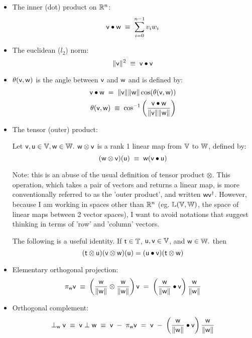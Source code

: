 \begin{itemize}
\item The inner (dot) product on $\mathbb{R}^n$:
\begin{equation}
\mathsf{v} \bullet \mathsf{w} \; \equiv \; \sum_{i=0}^{n-1} v_i w_i
\end{equation}

\item The euclidean ($l_2$) norm:
\begin{equation}
\| \mathsf{v} \|^2 \; \equiv \; \mathsf{v} \bullet \mathsf{v}
\end{equation}

\item $\theta(\mathsf{v},\mathsf{w})$ is the angle between $\mathsf{v}$ and $\mathsf{w}$
and is defined by:
\begin{eqnarray}
\mathsf{v} \bullet \mathsf{w} \; = \; \| \mathsf{v} \| \| \mathsf{w} \| \cos(\theta(\mathsf{v},\mathsf{w}))
\\
\theta(\mathsf{v},\mathsf{w})
\; \equiv \;
\cos^{-1} \left(\frac{ \mathsf{v} \bullet \mathsf{w} }{\| \mathsf{v} \| \| \mathsf{w} \| } \right)
\nonumber
\end{eqnarray}

\item The tensor (outer) product:

Let $\mathsf{v}, \mathsf{u} \in \mathbb{V}, \mathsf{w} \in \mathbb{W}.$
$\mathsf{w} \otimes \mathsf{v}$ is a rank 1 linear map
from $\mathbb{V}$ to $\mathbb{W}$, defined by:
\begin{equation}
(\mathsf{w} \otimes \mathsf{v})(\mathsf{u}) \; \equiv \; \mathsf{w} (\mathsf{v} \bullet \mathsf{u})
\end{equation}

Note: this is an abuse of the usual definition of tensor product $\otimes$.
This operation, which takes a pair of vectors and returns a linear map,
is more conventionally referred to as the 'outer product',
and written $\mathsf{w} \mathsf{v}^{\dagger}$.
However, because I am working in spaces other than $\mathbb{R}^n$
(eg. $\mathbb{L}(\mathbb{V},\mathbb{W})$, the space of linear maps
between 2 vector spaces),
I want to avoid notations that suggest thinking in terms
of 'row' and 'column' vectors.

The following is a useful identity.
If $\mathsf{t} \in \mathbb{T}$, $\mathsf{u}, \mathsf{v} \in \mathbb{V}$, and $\mathsf{w} \in \mathbb{W}.$
then
\begin{equation}
\label{eq:tensor-dot}
(\mathsf{t} \otimes \mathsf{u}) (\mathsf{v} \otimes \mathsf{w})(\mathsf{u}) = (\mathsf{u} \bullet \mathsf{v}) (\mathsf{t} \otimes \mathsf{w})
\end{equation}

\item Elementary orthogonal projection:
\begin{equation}
\pi_{\mathsf{w}} \mathsf{v}
\; \equiv \;
\left( \frac{ \mathsf{w} }{ \| \mathsf{w} \| } \otimes \frac{ \mathsf{w} }{ \| \mathsf{w} \| } \right) \mathsf{v}
\; = \;
\left( \frac{\mathsf{w} }{\|\mathsf{w}\|} \bullet \mathsf{v} \right) \frac{\mathsf{w}}{\|\mathsf{w}\|}
\end{equation}

\item Orthogonal complement:
\begin{equation}
\perp_{\mathsf{w}} \mathsf{v}
\; \equiv \;
\mathsf{v} \perp \mathsf{w}
\; \equiv \;
\mathsf{v} \; - \; \pi_{\mathsf{w}} \mathsf{v}
\; = \;
\mathsf{v} \; - \; \left( \frac{\mathsf{w}}{\|\mathsf{w}\|} \bullet \mathsf{v} \right) \frac{\mathsf{w}}{\|\mathsf{w}\|}
\end{equation}

\end{itemize}

